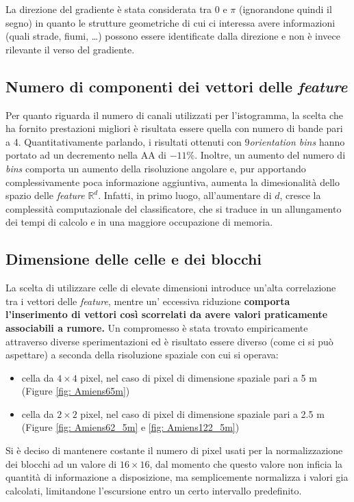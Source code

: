La direzione del gradiente è stata considerata tra $0$ e $\pi$ (ignorandone quindi il segno) in quanto le strutture geometriche di cui ci interessa avere informazioni (quali strade, fiumi, \ldots) possono essere identificate dalla direzione e non è invece rilevante il verso del gradiente.

\subsection{Numero di componenti dei vettori delle \emph{feature}}
Per quanto riguarda il numero di canali utilizzati per l'istogramma, la scelta che ha fornito prestazioni migliori è risultata essere quella con numero di bande pari a 4. Quantitativamente parlando, i risultati ottenuti con $9$\emph{orientation bins} hanno portato ad un decremento nella AA di $-11\%$. Inoltre, un aumento del numero di \emph{bins} comporta un aumento della risoluzione angolare e, pur apportando complessivamente poca informazione aggiuntiva,  aumenta la dimesionalità dello spazio delle \emph{feature} $\mathbb{R}^d$. Infatti, in primo luogo, all'aumentare di $d$, cresce la complessità computazionale del classificatore, che si traduce in un allungamento dei tempi di calcolo e in una maggiore occupazione di memoria.

\subsection{Dimensione delle celle e dei blocchi}
La scelta di utilizzare celle di elevate dimensioni introduce un'alta correlazione tra i vettori delle \emph{feature}, mentre un' eccessiva riduzione \textbf{comporta l'inserimento di vettori così scorrelati da avere valori praticamente associabili a rumore.} Un compromesso  è stata trovato empiricamente attraverso diverse sperimentazioni ed è risultato essere diverso (come ci si può aspettare) a seconda della risoluzione spaziale con cui si operava:
\begin{itemize}
\item cella da $4\times 4$ pixel, nel caso di pixel di dimensione spaziale pari a 5 m (Figure \ref{fig: Amiens65m})
\item cella da $2 \times 2$ pixel, nel caso di pixel di dimensione spaziale pari a 2.5 m (Figure \ref{fig: Amiens62_5m} e \ref{fig: Amiens122_5m})
\end{itemize}

Si è deciso di mantenere costante il numero di pixel usati per la normalizzazione dei blocchi ad un valore di $16\times16$, dal momento che questo valore non inficia la quantità di informazione a disposizione, ma semplicemente normalizza i valori gia calcolati, limitandone l'escursione entro un certo intervallo predefinito.


